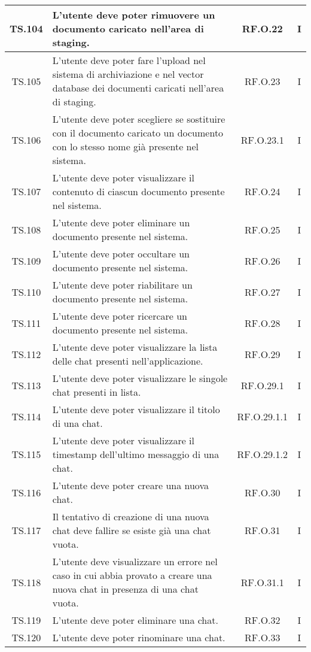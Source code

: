 {{{{{{{{{\begin{xltabular}{\textwidth}{|c|X|c|c|}
    \hline
    TS.104 & L’utente deve poter rimuovere un documento caricato nell’area di staging. & RF.O.22 & I \\
    \hline
    TS.105 & L’utente deve poter fare l’upload nel sistema di archiviazione e nel vector database dei documenti caricati nell’area di staging. & RF.O.23 & I \\
    \hline
    TS.106 & L’utente deve poter scegliere se sostituire con il documento caricato un documento con lo stesso nome già presente nel sistema. & RF.O.23.1 & I \\
    \hline
    TS.107 & L’utente deve poter visualizzare il contenuto di ciascun documento presente nel sistema. & RF.O.24 & I \\
    \hline
    TS.108 & L’utente deve poter eliminare un documento presente nel sistema. & RF.O.25 & I \\
    \hline
    TS.109 & L’utente deve poter occultare un documento presente nel sistema. & RF.O.26 & I \\
    \hline
    TS.110 & L’utente deve poter riabilitare un documento presente nel sistema. & RF.O.27 & I \\
    \hline
    TS.111 & L’utente deve poter ricercare un documento presente nel sistema. & RF.O.28 & I \\
    \hline
    TS.112 & L’utente deve poter visualizzare la lista delle chat presenti nell’applicazione. & RF.O.29 & I \\
    \hline
    TS.113 & L’utente deve poter visualizzare le singole chat presenti in lista. & RF.O.29.1 & I \\
    \hline
    TS.114 & L’utente deve poter visualizzare il titolo di una chat. & RF.O.29.1.1 & I \\
    \hline
    TS.115 & L’utente deve poter visualizzare il timestamp dell’ultimo messaggio di una chat. & RF.O.29.1.2 & I \\
    \hline
    TS.116 & L’utente deve poter creare una nuova chat. & RF.O.30 & I \\
    \hline
    TS.117 & Il tentativo di creazione di una nuova chat deve fallire se esiste già una chat vuota. & RF.O.31 & I \\
    \hline
    TS.118 & L’utente deve visualizzare un errore nel caso in cui abbia provato a creare una nuova chat in presenza di una chat vuota. & RF.O.31.1 & I \\
    \hline
    TS.119 & L’utente deve poter eliminare una chat. & RF.O.32 & I \\
    \hline
    TS.120 & L’utente deve poter rinominare una chat. & RF.O.33 & I \\

\end{xltabular}}}}}}}}}}
